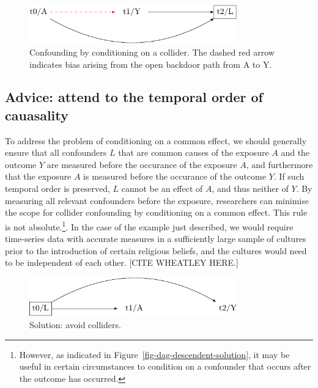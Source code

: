 \documentclass[
  singlecolumn]{report}
\begin{document}
\begin{figure}

{\centering \includegraphics[width=0.8\textwidth,height=\textheight]{causal-dags_files/figure-pdf/fig-dag-common-effect-1.pdf}

}

\caption{\label{fig-dag-common-effect}Confounding by conditioning on a
collider. The dashed red arrow indicates bias arising from the open
backdoor path from A to Y.}

\end{figure}

\hypertarget{advice-attend-to-the-temporal-order-of-cauasality-1}{%
\subsection{Advice: attend to the temporal order of
cauasality}\label{advice-attend-to-the-temporal-order-of-cauasality-1}}

To address the problem of conditioning on a common effect, we should
generally ensure that all confounders \(L\) that are common causes of
the exposure \(A\) and the outcome \(Y\) are measured before the
occurance of the exposure \(A\), and furthermore that the exposure \(A\)
is measured before the occurance of the outcome \(Y\). If such temporal
order is preserved, \(L\) cannot be an effect of \(A\), and thus neither
of \(Y\). By measuring all relevant confounders before the exposure,
researchers can minimise the scope for collider confounding by
conditioning on a common effect. This rule is not absolute.\footnote{However,
  as indicated in Figure~\ref{fig-dag-descendent-solution}, it may be
  useful in certain circumstances to condition on a confounder that
  occurs after the outcome has occurred.}. In the case of the example
just described, we would require time-series data with accurate measures
in a sufficiently large sample of cultures prior to the introduction of
certain religious beliefs, and the cultures would need to be independent
of each other. {[}CITE WHEATLEY HERE.{]}

\begin{figure}

{\centering \includegraphics[width=0.8\textwidth,height=\textheight]{causal-dags_files/figure-pdf/fig-dag-common-effect-solution-1.pdf}

}

\caption{\label{fig-dag-common-effect-solution}Solution: avoid
colliders.}

\end{figure}
\end{document}
